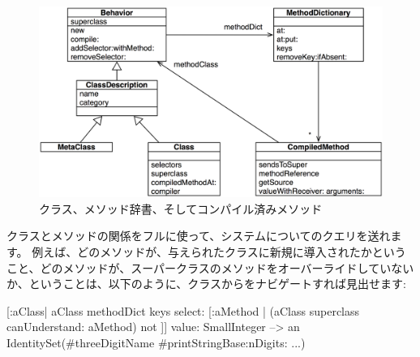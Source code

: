 \documentclass[a4paper,10pt,twoside]{book}
\begin{document}
\begin{figure}[ht]\centering
	\includegraphics[width=\linewidth]{MethodsAsObjects}
	\caption{クラス、メソッド辞書、そしてコンパイル済みメソッド\figlabel{MethodsAsObjects}}
\end{figure}

クラスとメソッドの関係をフルに使って、システムについてのクエリを送れます。
例えば、どのメソッドが、与えられたクラスに新規に導入されたかということ、\ie{}どのメソッドが、スーパークラスのメソッドをオーバーライドしていないか、ということは、以下のように、クラスからをナビゲートすれば見出せます:
\begin{code}{}
[:aClass| aClass methodDict keys select: [:aMethod |
  (aClass superclass canUnderstand: aMethod) not ]] value: SmallInteger
  --> an IdentitySet(#threeDigitName #printStringBase:nDigits: ...)
\end{code}
\end{document}
